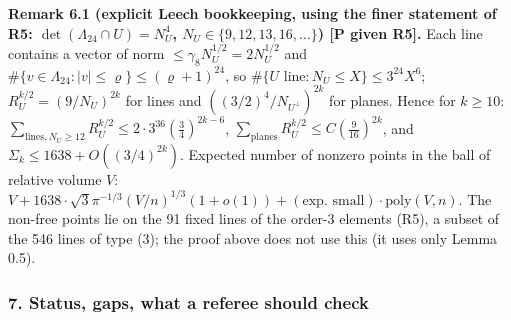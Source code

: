 \textbf{Remark 6.1 (explicit Leech bookkeeping, using the finer statement of R5: \(\det(\Lambda_{24}\cap U)=N_U^4\), \(N_U\in\{9,12,13,16,\dots\}\)) {[}P given R5{]}.} Each line contains a vector of norm \(\le\gamma_8N_U^{1/2}=2N_U^{1/2}\) and \(\#\{v\in\Lambda_{24}:|v|\le\varrho\}\le(\varrho+1)^{24}\), so \(\#\{U\text{ line}:N_U\le X\}\le3^{24}X^6\); \(R_U^{k/2}=(9/N_U)^{2k}\) for lines and \(((3/2)^4/N_{U^\perp})^{2k}\) for planes. Hence for \(k\ge10\): \(\sum_{\text{lines},N_U\ge12}R_U^{k/2}\le2\cdot3^{36}(\tfrac34)^{2k-6}\), \(\sum_{\text{planes}}R_U^{k/2}\le C(\tfrac9{16})^{2k}\), and \(\Sigma_k\le1638+O((3/4)^{2k})\). Expected number of nonzero points in the ball of relative volume \(V\): \(V+1638\cdot\sqrt3\pi^{-1/3}(V/n)^{1/3}(1+o(1))+(\text{exp. small})\cdot\mathrm{poly}(V,n)\). The non-free points lie on the 91 fixed lines of the order-3 elements (R5), a subset of the 546 lines of type (3); the proof above does not use this (it uses only Lemma 0.5).

\hypertarget{status-gaps-what-a-referee-should-check}{%
\subsubsection*{7. Status, gaps, what a referee should check}\label{status-gaps-what-a-referee-should-check}}


